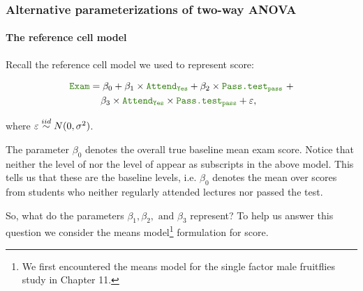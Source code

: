 \documentclass{beamer}\usepackage[]{graphicx}\usepackage[]{xcolor}
\begin{document}


\begin{frame}[fragile, label={frame:2way_RefCellModel}]
\frametitle{Alternative parameterizations of two-way ANOVA}
\framesubtitle{The reference cell model}
  
Recall the reference cell model we used to represent  score:
  
\vspace{-5mm}

\begin{align*}
\rcode{Exam} &= \beta_0 + \beta_1 \times \rcode{Attend}_{\rcode{Yes}} + \beta_2 \times \rcode{Pass.test}_{\rcode{pass}}\mbox{ } + \\ &\phantom{=}\mbox{ }\beta_3 \times \rcode{Attend}_{\rcode{Yes}} \times \rcode{Pass.test}_{\rcode{pass}} + \varepsilon,
\end{align*}

\vspace{-5mm}

where $\varepsilon \stackrel{iid}{\sim} N(0, \sigma^2)$.

\medskip

The parameter $\beta_0$ denotes the overall true baseline mean exam score. Notice that neither the  level of  nor the  level of  appear as subscripts in the above model. This tells us that these are the baseline levels, i.e. $\beta_0$ denotes the mean over  scores from students who neither regularly attended lectures nor passed the test.

\medskip

So, what do the parameters $\beta_1,\beta_2,\text{ and }\beta_3$ represent? To help us answer this question we consider the means model\footnote{We first encountered the means model for the single factor male fruitflies study in Chapter 11.} formulation for  score. 
  
\end{frame}  
\end{document}
